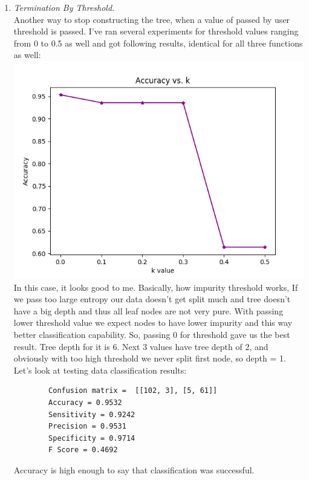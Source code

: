 \documentclass[12pt, letterpaper]{article}
\begin{document}
\begin{enumerate}[label=\Roman*.]
\begin{enumerate}[label=\arabic*.]
		\item {\it Termination By Threshold. }\\
		
		Another way to stop constructing the tree, when a value of passed by user threshold is passed. I've ran several experiments for threshold values ranging from 0 to 0.5 as well and got following results, identical for all three functions as well: \\
		\includegraphics[scale=0.7]{../images/accuracy_validation_DT_Threshold_gini.png} \\ 
		In this case, it looks good to me. Basically, how impurity threshold works, If we pass too large entropy our data doesn't get split much and tree doesn't have a big depth and thus all leaf nodes are not very pure. With passing lower threshold value we expect nodes to have lower impurity and this way better classification capability. So, passing 0 for threshold gave us the best result. Tree depth for it is 6. Next 3 values have tree depth of 2, and obviously with too high threshold we never split first node, so depth = 1.  \\Let's look at testing data classification results: 
		\begin{verbatim}		
		Confusion matrix =  [[102, 3], [5, 61]] 
		Accuracy = 0.9532
		Sensitivity = 0.9242
		Precision = 0.9531
		Specificity = 0.9714
		F Score = 0.4692
		\end{verbatim}
		
		Accuracy is high enough to say that classification was successful. \\
		

\end{enumerate}
\end{enumerate}
\end{document}

